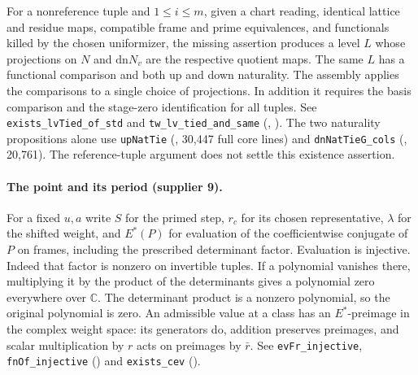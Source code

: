 For a nonreference tuple and $1\le i\le m$, given a chart reading, identical
lattice and residue maps, compatible frame and prime equivalences, and
functionals killed by the chosen uniformizer, the missing assertion produces
a level $L$ whose projections on $N$ and $\mathrm{dn}N_v$ are the
respective quotient maps. The same $L$ has a functional comparison and
both up and down naturality. The assembly applies the comparisons to a
single choice of projections. In addition it requires the basis comparison
and the stage-zero identification for all tuples.
See \nolinkurl{exists_lvTied_of_std} and \nolinkurl{tw_lv_tied_and_same}
(,
).
The two naturality propositions alone use \nolinkurl{upNatTie}
(, 30,447 full core lines) and
\nolinkurl{dnNatTieG_cols}
(, 20,761).
The reference-tuple argument does not settle this existence assertion.

\paragraph{The point and its period (supplier 9).}
For a fixed $u,a$ write $S$ for the primed step, $r_c$ for its chosen
representative, $\lambda$ for the shifted weight, and $E^*(P)$ for
evaluation of the coefficientwise conjugate of $P$ on frames, including
the prescribed determinant factor. Evaluation is injective. Indeed that
factor is nonzero on invertible tuples. If a polynomial vanishes there,
multiplying it by the product of the determinants gives a polynomial zero
everywhere over $\mathbb C$. The determinant product is a nonzero
polynomial, so the original polynomial is zero. An admissible value at
a class has an $E^*$-preimage in the complex weight space: its generators
do, addition preserves preimages, and scalar multiplication by $r$ acts on
preimages by $\bar r$. See \nolinkurl{evFr_injective},
\nolinkurl{fnOf_injective} ()
and \nolinkurl{exists_cev} ().


